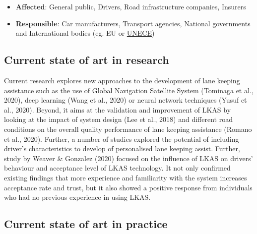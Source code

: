 \documentclass[
]{book}
\providecommand{\tightlist}{%
  \setlength{\itemsep}{0pt}\setlength{\parskip}{0pt}}
\begin{document}
\begin{itemize}
\tightlist
\item
  \textbf{Affected}: General public, Drivers, Road infrastructure companies, Insurers
\item
  \textbf{Responsible}: Car manufacturers, Transport agencies, National governments and International bodies (eg. EU or \href{https://unece.org/fileadmin/DAM/trans/main/wp29/wp29regs/2018/R079r4e.pdf}{UNECE})
\end{itemize}

\hypertarget{current-state-of-art-in-research-19}{%
\subsection*{Current state of art in research}\label{current-state-of-art-in-research-19}}

Current research explores new approaches to the development of lane keeping assistance such as the use of Global Navigation Satellite System (Tominaga et al., 2020), deep learning (Wang et al., 2020) or neural network techniques (Yusuf et al., 2020). Beyond, it aims at the validation and improvement of LKAS by looking at the impact of system design (Lee et al., 2018) and different road conditions on the overall quality performance of lane keeping assistance (Romano et al., 2020). Further, a number of studies explored the potential of including driver's characteristics to develop of personalised lane keeping assist.
Further, study by Weaver \& Gonzalez (2020) focused on the influence of LKAS on drivers' behaviour and acceptance level of LKAS technology. It not only confirmed existing findings that more experience and familiarity with the system increases acceptance rate and trust, but it also showed a positive response from individuals who had no previous experience in using LKAS.

\hypertarget{current-state-of-art-in-practice-18}{%
\subsection*{Current state of art in practice}\label{current-state-of-art-in-practice-18}}
\end{document}
